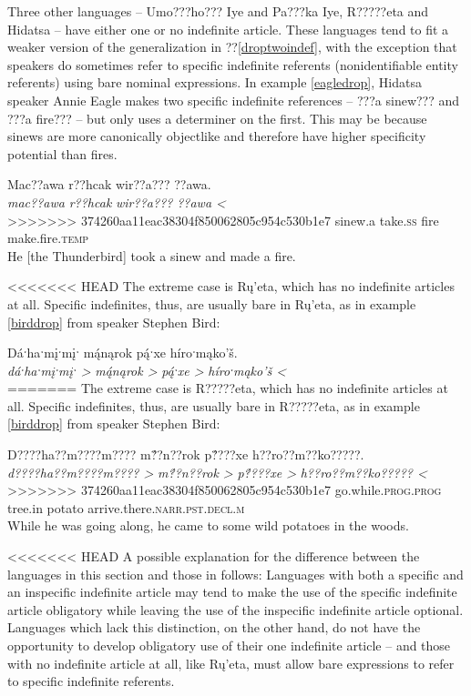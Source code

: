 \documentclass[output=paper]{LSP/langsci}
\begin{document}
Three other languages -- Umo???ho??? Iye and Pa???ka Iye, R?????eta and Hidatsa -- have either one or no indefinite article. These languages tend to fit a weaker version of the generalization in ??\ref{droptwoindef}, with the exception that speakers do sometimes refer to specific indefinite referents (nonidentifiable entity referents) using bare nominal expressions. In example \ref{eagledrop}, Hidatsa speaker Annie Eagle makes two specific indefinite references -- ???a sinew??? and ???a fire??? -- but only uses a determiner on the first. This may be because sinews are more canonically objectlike and therefore have higher specificity potential than fires.

\ea\label{eagledrop}
Mac??awa r??hcak wir??a??? ??awa.\footnotemark\\
\gll	\emph{mac??awa} 	\emph{r??hcak} 	\emph{wir??a???}	\emph{??awa <}\\
>>>>>>> 374260aa11eac38304f850062805c954c530b1e7
	sinew.a 		take.\textsc{ss} 	fire 			make.fire.\textsc{temp}\\
\glt	He [the Thunderbird] took a sinew and made a fire.
\z

<<<<<<< HEAD
The extreme case is Rų’eta, which has no indefinite articles at all. Specific indefinites, thus, are usually bare in Rų’eta, as in example \ref{birddrop} from speaker Stephen Bird:

\ea\label{birddrop}
Dáˑhaˑmįˑmįˑ m\'{ą}nąrok p\'{ą}ˑxe híroˑmąko’š.\footnotemark\\
\gll	\emph{dáˑhaˑmįˑmįˑ >}		\emph{m\'{ą}nąrok >}	\emph{p\'{ą}ˑxe >}	\emph{híroˑmąko’š <}\\
=======
The extreme case is R?????eta, which has no indefinite articles at all. Specific indefinites, thus, are usually bare in R?????eta, as in example \ref{birddrop} from speaker Stephen Bird:

\ea\label{birddrop}
D????ha??m????m???? m\'{??}n??rok p\'{??}??xe h??ro??m??ko?????.\footnotemark\\
\gll	\emph{d????ha??m????m???? >}		\emph{m\'{??}n??rok >}	\emph{p\'{??}??xe >}	\emph{h??ro??m??ko????? <}\\
>>>>>>> 374260aa11eac38304f850062805c954c530b1e7
	go.while.\textsc{prog.prog} 	tree.in 			potato 		arrive.there.\textsc{narr.pst.decl.m}\\
\glt	While he was going along, he came to some wild potatoes in the woods.
\z

<<<<<<< HEAD
A possible explanation for the difference between the languages in this section and those in  follows: Languages with both a specific and an inspecific indefinite article may tend to make the use of the specific indefinite article obligatory while leaving the use of the inspecific indefinite article optional. Languages which lack this distinction, on the other hand, do not have the opportunity to develop obligatory use of their one indefinite article -- and those with no indefinite article at all, like Rų’eta, must allow bare expressions to refer to specific indefinite referents.
\end{document}
